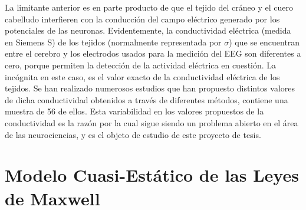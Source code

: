 La limitante anterior es en parte producto de que el tejido del cráneo y el cuero cabelludo interfieren con la conducción del campo eléctrico generado por los potenciales de las neuronas.
Evidentemente, la conductividad eléctrica (medida en Siemens S) de los tejidos (normalmente representada por $\sigma$) que se encuentran entre el cerebro y los electrodos usados para la medición del EEG son diferentes a cero, porque permiten la detección de la actividad eléctrica en cuestión. 
La incógnita en este caso, es el valor exacto de la conductividad eléctrica de los tejidos.
Se han realizado numerosos estudios que han propuesto distintos valores de dicha conductividad obtenidos a través de diferentes métodos, \cite{McCann2019} contiene una muestra de 56 de ellos. 
Esta variabilidad en los valores propuestos de la conductividad es la razón por la cual sigue siendo un problema abierto en el área de las neurociencias, y es el objeto de estudio de este proyecto de tesis.

\section{Modelo Cuasi-Estático de las Leyes de Maxwell}
\label{sec:intro:physics}

